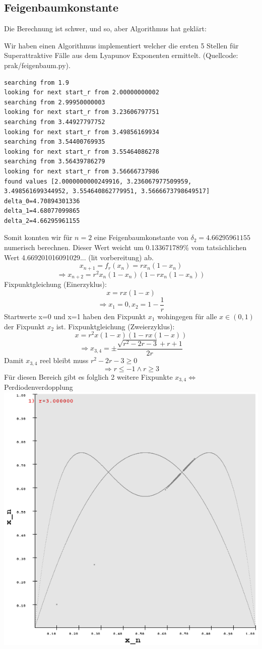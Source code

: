 \documentclass{scrartcl}
\begin{document}
\subsection{Feigenbaumkonstante}
Die Berechnung ist schwer, und so, aber Algorithmus hat geklärt:

Wir haben einen Algorithmus implementiert welcher die ersten 5 Stellen für Superattraktive Fälle aus dem Lyapunov Exponenten ermittelt. (Quellcode: prak/feigenbaum.py). 
       
\begin{lstlisting}
searching from 1.9
looking for next start_r from 2.00000000002
searching from 2.99950000003
looking for next start_r from 3.23606797751
searching from 3.44927797752
looking for next start_r from 3.49856169934
searching from 3.54400769935
looking for next start_r from 3.55464086278
searching from 3.56439786279
looking for next start_r from 3.56666737986
found values [2.0000000000249916, 3.236067977509959, 3.498561699344952, 3.554640862779951, 3.5666673798649517]
delta_0=4.70894301336
delta_1=4.68077099865
delta_2=4.66295961155
\end{lstlisting}
Somit konnten wir für $n=2$ eine Feigenbaumkonstante von $\delta_2=4.66295961155$ numerisch berechnen. Dieser Wert weicht um 0.133671789\% vom tatsächlichen Wert 4.669201016091029... (lit vorbereitung) ab. $$x_{n+1}=f_r(x_n)=rx_n(1-x_n)$$
$$\Rightarrow x_{n+2}=r^2x_n(1-x_n)(1-rx_n(1-x_n))$$
\newline
Fixpunktgleichung (Einerzyklus): 
$$x=rx(1-x)$$
$$\Rightarrow x_1=0, x_2=1-\frac{1}{r}$$
Startwerte x=0 und x=1 haben den Fixpunkt $x_1$ wohingegen für alle $x\in (0,1)$ der Fixpunkt $x_2$ ist.
\newline
Fixpunktgleichung (Zweierzyklus):
$$x=r^2x(1-x)(1-rx(1-x))$$
$$\Rightarrow x_{3,4}=\pm\frac{\sqrt{r^2-2 r-3}+r+1}{2 r}$$
Damit $x_{3,4}$ reel bleibt muss $r^2-2 r-3 \geq 0$
$$\Rightarrow r \leq -1 \land r \geq 3$$
Für diesen Bereich gibt es folglich 2 weitere Fixpunkte $x_{3,4} \Leftrightarrow$ Perdiodenverdopplung 
\newline
\includegraphics[scale=0.3]{r3}
\end{document}
